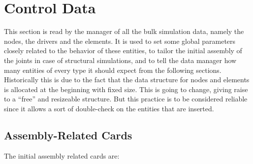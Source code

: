 %
%
%
%
%
% 
%
%

\chapter{Control Data}\label{sec:CONTROL-DATA}
This section is read by the manager of all the bulk simulation data, namely
the nodes, the drivers and the elements. It is used to set some global
parameters closely related to the behavior of these entities, to tailor the
initial assembly of the joints in case of structural simulations, and to
tell the data manager how many entities of every type it should expect from
the following sections. Historically this is due to the fact that the data
structure for nodes and elements is allocated at the beginning with fixed
size. This is going to change, giving raise to a ``free'' and resizeable
structure. But this practice is to be considered reliable since it allows a
sort of double-check on the entities that are inserted.

\section{Assembly-Related Cards}
The initial assembly related cards are: 

